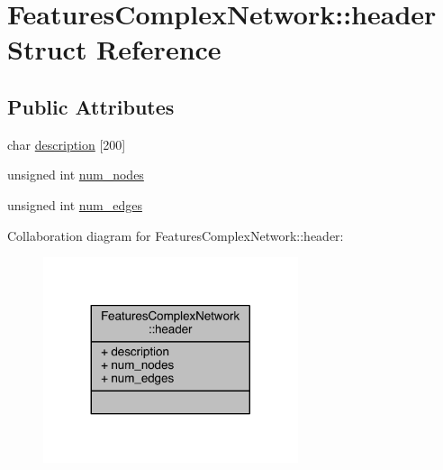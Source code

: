 \hypertarget{struct_features_complex_network_1_1header}{\section{Features\+Complex\+Network\+:\+:header Struct Reference}
\label{struct_features_complex_network_1_1header}
}
\subsection*{Public Attributes}
\begin{DoxyCompactItemize}
\item 
char \hyperlink{struct_features_complex_network_1_1header_a945df90d139764d666deaa9d97a773ff}{description} \mbox{[}200\mbox{]}
\item 
unsigned int \hyperlink{struct_features_complex_network_1_1header_ada02d47d8920c0e0d6429580ca9c370e}{num\+\_\+nodes}
\item 
unsigned int \hyperlink{struct_features_complex_network_1_1header_a7cc9d5e2f1368904ae6b75027f3714d6}{num\+\_\+edges}
\end{DoxyCompactItemize}


Collaboration diagram for Features\+Complex\+Network\+:\+:header\+:\nopagebreak
\begin{figure}[H]
\begin{center}
\leavevmode
\includegraphics[width=212pt]{struct_features_complex_network_1_1header__coll__graph}
\end{center}
\end{figure}


